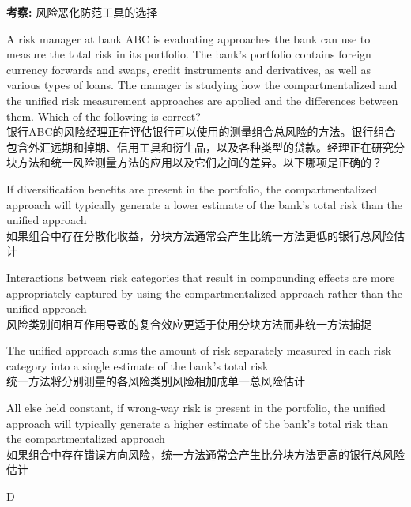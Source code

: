 \documentclass{article}
\newcounter{question} %
\newcommand{\checklist}[1]{
    \textbf{考察:} #1 \par %
    \addcontentsline{toc}{subsection}{题号\thequestion 考察: #1} %
    \vspace{2em} %
}
\begin{document}
\checklist{风险恶化防范工具的选择}



\begin{question}
    A risk manager at bank ABC is evaluating approaches the bank can use to measure the total risk in its portfolio. The bank's portfolio contains foreign currency forwards and swaps, credit instruments and derivatives, as well as various types of loans. The manager is studying how the compartmentalized and the unified risk measurement approaches are applied and the differences between them. Which of the following is correct?
    \\银行ABC的风险经理正在评估银行可以使用的测量组合总风险的方法。银行组合包含外汇远期和掉期、信用工具和衍生品，以及各种类型的贷款。经理正在研究分块方法和统一风险测量方法的应用以及它们之间的差异。以下哪项是正确的？
\end{question}

\begin{choices}
    \item If diversification benefits are present in the portfolio, the compartmentalized approach will typically generate a lower estimate of the bank's total risk than the unified approach\\
    如果组合中存在分散化收益，分块方法通常会产生比统一方法更低的银行总风险估计
    \item Interactions between risk categories that result in compounding effects are more appropriately captured by using the compartmentalized approach rather than the unified approach\\
    风险类别间相互作用导致的复合效应更适于使用分块方法而非统一方法捕捉
    \item The unified approach sums the amount of risk separately measured in each risk category into a single estimate of the bank's total risk\\
    统一方法将分别测量的各风险类别风险相加成单一总风险估计
    \item All else held constant, if wrong-way risk is present in the portfolio, the unified approach will typically generate a higher estimate of the bank's total risk than the compartmentalized approach\\
    如果组合中存在错误方向风险，统一方法通常会产生比分块方法更高的银行总风险估计
\end{choices}

\begin{correctanswer}
    D
\end{correctanswer}
\end{document}
